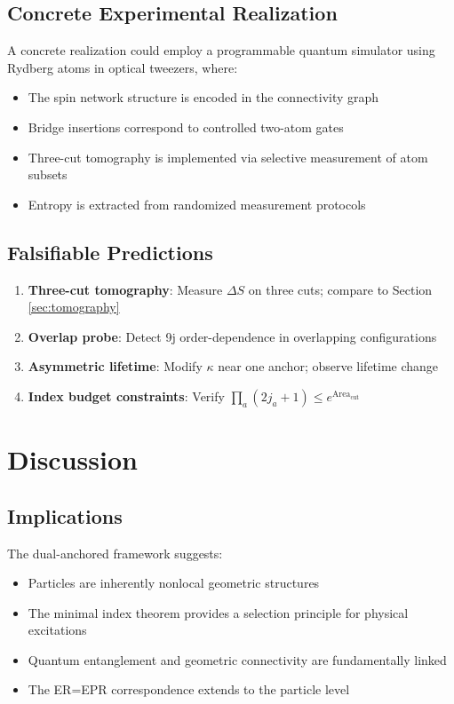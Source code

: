 \documentclass[11pt]{article}
\theoremstyle{plain}
\theoremstyle{definition}
\begin{document}
\subsection{Concrete Experimental Realization}

A concrete realization could employ a programmable quantum simulator using Rydberg atoms in optical tweezers, where:
\begin{itemize}
  \item The spin network structure is encoded in the connectivity graph
  \item Bridge insertions correspond to controlled two-atom gates
  \item Three-cut tomography is implemented via selective measurement of atom subsets
  \item Entropy is extracted from randomized measurement protocols
\end{itemize}

\subsection{Falsifiable Predictions}

\begin{enumerate}
  \item \textbf{Three-cut tomography}: Measure $\Delta S$ on three cuts; compare to Section \ref{sec:tomography}
  \item \textbf{Overlap probe}: Detect 9j order-dependence in overlapping configurations
  \item \textbf{Asymmetric lifetime}: Modify $\kappa$ near one anchor; observe lifetime change
  \item \textbf{Index budget constraints}: Verify $\prod_a(2j_a+1) \leq e^{\text{Area}_{\text{cut}}}$
\end{enumerate}

\section{Discussion}
\label{sec:discussion}

\subsection{Implications}

The dual-anchored framework suggests:
\begin{itemize}
  \item Particles are inherently nonlocal geometric structures
  \item The minimal index theorem provides a selection principle for physical excitations
  \item Quantum entanglement and geometric connectivity are fundamentally linked
  \item The ER=EPR correspondence extends to the particle level
\end{itemize}
\end{document}
